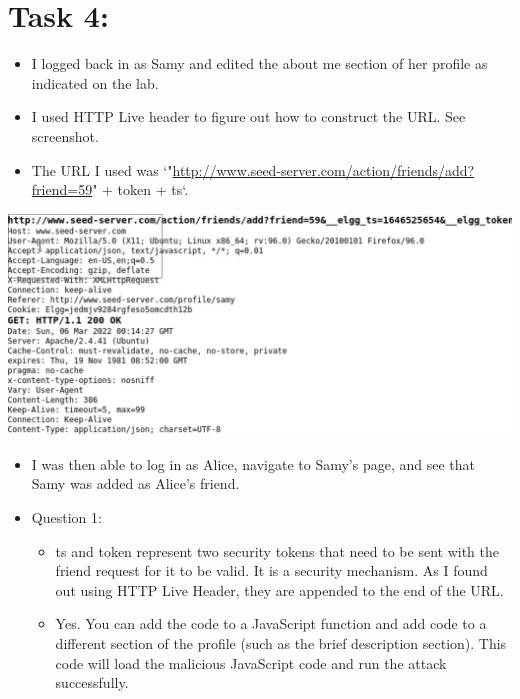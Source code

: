 \documentclass[11pt]{article}
\begin{document}
\section*{Task 4:}
\label{sec:orga8db40b}
\begin{itemize}
\item I logged back in as Samy and edited the about me section of her profile as indicated on the lab.
\item I used HTTP Live header to figure out how to construct the URL. See screenshot.
\item The URL I used was `"\url{http://www.seed-server.com/action/friends/add?friend=59}" + token + ts`.
\end{itemize}
\begin{center}
\includegraphics[width=.9\linewidth]{./images/3.jpg}
\end{center}
\begin{itemize}
\item I was then able to log in as Alice, navigate to Samy's page, and see that Samy was added as Alice's friend.
\item Question 1:
\begin{itemize}
\item ts and token represent two security tokens that need to be sent with the friend request for it to be valid. It is a security mechanism. As I found out using HTTP Live Header, they are appended to the end of the URL.
\item Yes. You can add the code to a JavaScript function and add code to a different section of the profile (such as the brief description section). This code will load the malicious JavaScript code and run the attack successfully.
\end{itemize}
\end{itemize}
\end{document}
